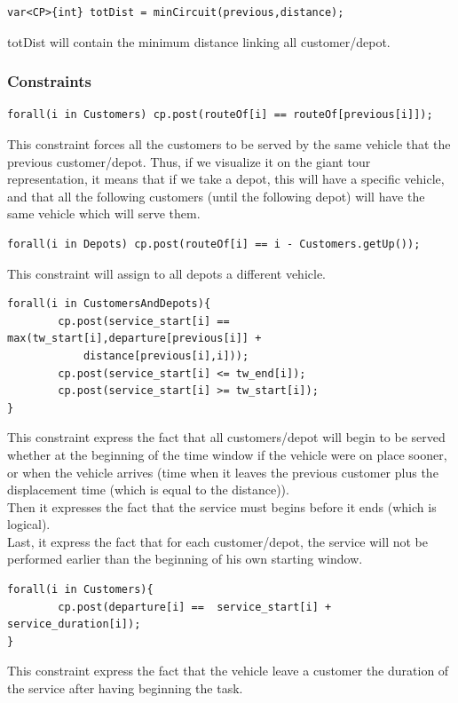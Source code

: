 \documentclass[a4paper ,12pt,french]{article}
\begin{document}
\begin{verbatim}
var<CP>{int} totDist = minCircuit(previous,distance);
\end{verbatim}
totDist will contain the minimum distance linking all customer/depot.


\subsubsection*{Constraints}

\begin{verbatim}
forall(i in Customers) cp.post(routeOf[i] == routeOf[previous[i]]);
\end{verbatim}
This constraint forces all the customers to be served by the same vehicle that the previous customer/depot.
Thus, if we visualize it on the giant tour representation, it means that if we take a depot, this will have a specific vehicle,  and that all the following customers (until the following depot) will have the same vehicle which will serve them.


\begin{verbatim}
forall(i in Depots) cp.post(routeOf[i] == i - Customers.getUp());
\end{verbatim}
This constraint will assign to all depots a different vehicle.

\begin{verbatim}
forall(i in CustomersAndDepots){
        cp.post(service_start[i] == max(tw_start[i],departure[previous[i]] + 
            distance[previous[i],i]));
        cp.post(service_start[i] <= tw_end[i]);
        cp.post(service_start[i] >= tw_start[i]);
}
\end{verbatim}

This constraint express the fact that all customers/depot will begin to be served whether at the beginning of the time window if the vehicle were on place sooner, or when the vehicle arrives (time when it leaves the previous customer plus the displacement time (which is equal to the distance)).\\
Then it expresses the fact that the service must begins before it ends (which is logical).\\
Last, it express the fact that for each customer/depot, the service will not be performed earlier than the beginning of his own starting window.

	
	
\begin{verbatim}
forall(i in Customers){
        cp.post(departure[i] ==  service_start[i] + service_duration[i]);
}
\end{verbatim}
This constraint express the fact that the vehicle leave a customer the duration of the service after having beginning the task.
	
\end{document}
